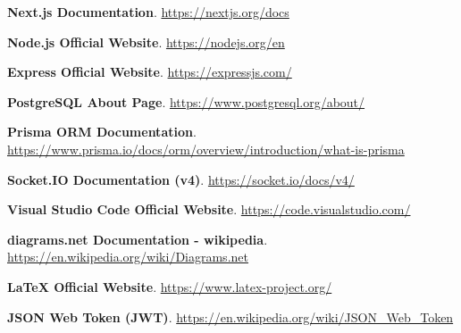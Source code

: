 \begin{enumerate}[label={[\arabic*]},leftmargin=*]
    \item \label{ref:nextjs} \textbf{Next.js Documentation}.
    \url{https://nextjs.org/docs}

    \item \label{ref:nodejs} \textbf{Node.js Official Website}.
    \url{https://nodejs.org/en}

    \item \label{ref:express} \textbf{Express Official Website}.
    \url{https://expressjs.com/}

    \item \label{ref:postgresql} \textbf{PostgreSQL About Page}.
    \url{https://www.postgresql.org/about/}

    \item \label{ref:prisma} \textbf{Prisma ORM Documentation}.
    \url{https://www.prisma.io/docs/orm/overview/introduction/what-is-prisma}

    \item \label{ref:socketio} \textbf{Socket.IO Documentation (v4)}.
    \url{https://socket.io/docs/v4/}

    \item \label{ref:vscode} \textbf{Visual Studio Code Official Website}.
    \url{https://code.visualstudio.com/}

    \item \label{ref:diagramsnet} \textbf{diagrams.net Documentation - wikipedia}.
    \url{https://en.wikipedia.org/wiki/Diagrams.net}

    \item \label{ref:latex} \textbf{LaTeX Official Website}.
    \url{https://www.latex-project.org/}

    \item \label{ref:jwt} \textbf{JSON Web Token (JWT)}.
    \url{https://en.wikipedia.org/wiki/JSON_Web_Token}
\end{enumerate}
